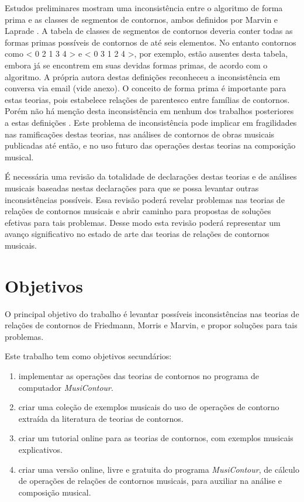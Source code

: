 \documentclass[12pt]{article}
\newcommand{\eng}[1]{\textit{#1}}
\begin{document}
Estudos preliminares mostram uma inconsistência entre o algoritmo de
forma prima e as classes de segmentos de contornos, ambos definidos
por Marvin e Laprade \cite{marvin.ea87:relating}. A tabela de classes
de segmentos de contornos deveria conter todas as formas primas
possíveis de contornos de até seis elementos. No entanto contornos
como < 0 2 1 3 4 > e < 0 3 1 2 4 >, por exemplo, estão ausentes desta
tabela, embora já se encontrem em suas devidas formas primas, de
acordo com o algoritmo. A própria autora destas definições reconheceu
a inconsistência em conversa via email (vide anexo). O conceito de
forma prima é importante para estas teorias, pois estabelece relações
de parentesco entre famílias de contornos. Porém não há menção desta
inconsistência em nenhum dos trabalhos posteriores a estas definições
\cite{polansky.ea92:possible,clifford95:contour,quinn97:fuzzy,beard03:contour,bor09:contour,schultz08:melodic,schultz09:diachronic}. Este
problema de inconsistência pode implicar em fragilidades nas
ramificações destas teorias, nas análises de contornos de obras
musicais publicadas até então, e no uso futuro das operações destas
teorias na composição musical.

É necessária uma revisão da totalidade de declarações destas teorias e
de análises musicais baseadas nestas declarações para que se possa
levantar outras inconsistências possíveis. Essa revisão poderá revelar
problemas nas teorias de relações de contornos musicais e abrir
caminho para propostas de soluções efetivas para tais problemas. Desse
modo esta revisão poderá representar um avanço significativo no estado
de arte das teorias de relações de contornos musicais.

\section{Objetivos}
\label{sec:objetivos}

O principal objetivo do trabalho é levantar possíveis inconsistências
nas teorias de relações de contornos de Friedmann, Morris e Marvin, e
propor soluções para tais problemas.

Este trabalho tem como objetivos secundários:

\begin{enumerate}
\item implementar as operações das teorias de contornos no programa de
  computador \eng{MusiContour}.
\item criar uma coleção de exemplos musicais do uso de operações de
  contorno extraída da literatura de teorias de contornos.
\item criar um tutorial online para as teorias de contornos, com
  exemplos musicais explicativos.
\item criar uma versão online, livre e gratuita do programa
  \eng{MusiContour}, de cálculo de operações de relações de contornos
  musicais, para auxiliar na análise e composição musical.
\end{enumerate}
\end{document}
